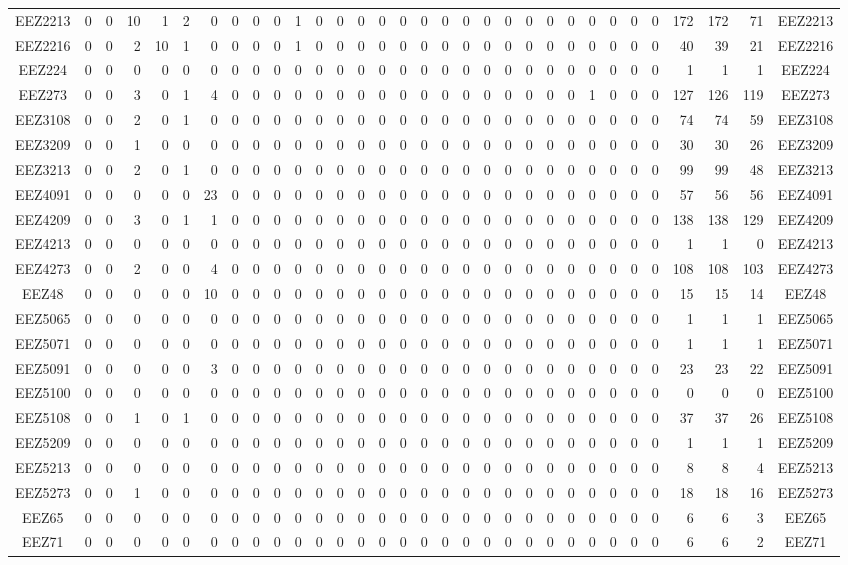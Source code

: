 \documentclass[10pt,a4paper,twoside]{report}
\begin{document}
{\begin{tabular}{crrrrrrrrrrrrrrrrrrrrrrrrrrrrrrc}
EEZ2213&0&0&10&1&2&0&0&0&0&1&0&0&0&0&0&0&0&0&0&0&0&0&0&0&0&0&0&172&172&71&EEZ2213\\
EEZ2216&0&0&2&10&1&0&0&0&0&1&0&0&0&0&0&0&0&0&0&0&0&0&0&0&0&0&0&40&39&21&EEZ2216\\
EEZ224&0&0&0&0&0&0&0&0&0&0&0&0&0&0&0&0&0&0&0&0&0&0&0&0&0&0&0&1&1&1&EEZ224\\
EEZ273&0&0&3&0&1&4&0&0&0&0&0&0&0&0&0&0&0&0&0&0&0&0&0&1&0&0&0&127&126&119&EEZ273\\
EEZ3108&0&0&2&0&1&0&0&0&0&0&0&0&0&0&0&0&0&0&0&0&0&0&0&0&0&0&0&74&74&59&EEZ3108\\
EEZ3209&0&0&1&0&0&0&0&0&0&0&0&0&0&0&0&0&0&0&0&0&0&0&0&0&0&0&0&30&30&26&EEZ3209\\
EEZ3213&0&0&2&0&1&0&0&0&0&0&0&0&0&0&0&0&0&0&0&0&0&0&0&0&0&0&0&99&99&48&EEZ3213\\
EEZ4091&0&0&0&0&0&23&0&0&0&0&0&0&0&0&0&0&0&0&0&0&0&0&0&0&0&0&0&57&56&56&EEZ4091\\
EEZ4209&0&0&3&0&1&1&0&0&0&0&0&0&0&0&0&0&0&0&0&0&0&0&0&0&0&0&0&138&138&129&EEZ4209\\
EEZ4213&0&0&0&0&0&0&0&0&0&0&0&0&0&0&0&0&0&0&0&0&0&0&0&0&0&0&0&1&1&0&EEZ4213\\
EEZ4273&0&0&2&0&0&4&0&0&0&0&0&0&0&0&0&0&0&0&0&0&0&0&0&0&0&0&0&108&108&103&EEZ4273\\
EEZ48&0&0&0&0&0&10&0&0&0&0&0&0&0&0&0&0&0&0&0&0&0&0&0&0&0&0&0&15&15&14&EEZ48\\
EEZ5065&0&0&0&0&0&0&0&0&0&0&0&0&0&0&0&0&0&0&0&0&0&0&0&0&0&0&0&1&1&1&EEZ5065\\
EEZ5071&0&0&0&0&0&0&0&0&0&0&0&0&0&0&0&0&0&0&0&0&0&0&0&0&0&0&0&1&1&1&EEZ5071\\
EEZ5091&0&0&0&0&0&3&0&0&0&0&0&0&0&0&0&0&0&0&0&0&0&0&0&0&0&0&0&23&23&22&EEZ5091\\
EEZ5100&0&0&0&0&0&0&0&0&0&0&0&0&0&0&0&0&0&0&0&0&0&0&0&0&0&0&0&0&0&0&EEZ5100\\
EEZ5108&0&0&1&0&1&0&0&0&0&0&0&0&0&0&0&0&0&0&0&0&0&0&0&0&0&0&0&37&37&26&EEZ5108\\
EEZ5209&0&0&0&0&0&0&0&0&0&0&0&0&0&0&0&0&0&0&0&0&0&0&0&0&0&0&0&1&1&1&EEZ5209\\
EEZ5213&0&0&0&0&0&0&0&0&0&0&0&0&0&0&0&0&0&0&0&0&0&0&0&0&0&0&0&8&8&4&EEZ5213\\
EEZ5273&0&0&1&0&0&0&0&0&0&0&0&0&0&0&0&0&0&0&0&0&0&0&0&0&0&0&0&18&18&16&EEZ5273\\
EEZ65&0&0&0&0&0&0&0&0&0&0&0&0&0&0&0&0&0&0&0&0&0&0&0&0&0&0&0&6&6&3&EEZ65\\
EEZ71&0&0&0&0&0&0&0&0&0&0&0&0&0&0&0&0&0&0&0&0&0&0&0&0&0&0&0&6&6&2&EEZ71\\

\end{tabular}}
\end{document}
